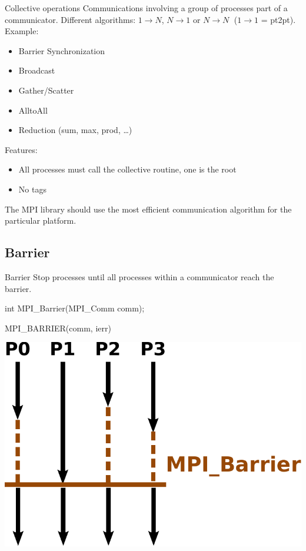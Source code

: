 \documentclass[aspectratio=43]{beamer}
\begin{document}
\begin{frame}{Collective operations}
Communications involving a group of processes part of a communicator.
Different algorithms: $1\rightarrow N$, $N\rightarrow 1$ or $N\rightarrow N\;$ ($1\rightarrow 1$ = pt2pt).\\

Example:
\begin{itemize}
\item Barrier Synchronization
\item Broadcast
\item Gather/Scatter
\item AlltoAll
\item Reduction (sum, max, prod, \ldots )
\end{itemize}

Features:
\begin{itemize}
    \item All processes must call the collective routine, one is the root
    \item No tags
\end{itemize}

The MPI library should use the most efficient communication algorithm for the particular platform.
\end{frame}


\subsection{Barrier}

\begin{frame}[fragile]{Barrier}
Stop processes until all processes within a communicator reach the barrier.\\
\begin{Cpplisting}[]{}
int MPI_Barrier(MPI_Comm comm);
\end{Cpplisting}
\begin{Fortranlisting}[]{}
MPI_BARRIER(comm, ierr)
\end{Fortranlisting}
\begin{center}
\includegraphics[scale=0.5]{03.MPI_Coll/barrier.pdf}
\end{center}
\end{frame}
\end{document}
